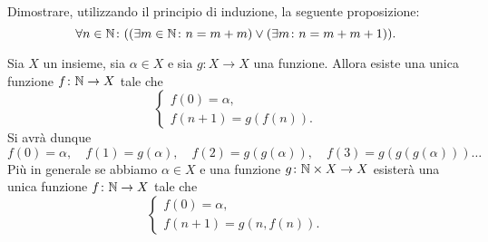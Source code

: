 \begin{exercise}
  Dimostrare, utilizzando il principio di induzione, la seguente 
  proposizione:
  \[
  \forall n\in \mathbb N\colon {\left( {\left( \exists m\in \mathbb N\colon n = m + m \right)} 
  \lor {\left( \exists m\colon n = m + m + 1 \right)} \right)}.  
  \]
\end{exercise}

\begin{theorem}
\label{th:induzione}%
Sia $X$ un insieme, sia $\alpha\in X$ e sia $g\colon X\to X$ una funzione.
Allora esiste una unica funzione $f\colon \mathbb N \to X$ tale che
\begin{equation}\label{eq:4835628}
  \begin{cases}
    f(0) = \alpha, \\
    f(n+1) = g(f(n)).
  \end{cases}
\end{equation}
Si avrà dunque
\[
  f(0) = \alpha,\quad
  f(1) = g(\alpha),\quad
  f(2) = g(g(\alpha)),\quad
  f(3) = g(g(g(\alpha)))\dots
\]
Più in generale se abbiamo $\alpha\in X$ e una funzione $g\colon \mathbb N \times X \to X$
esisterà una unica funzione $f\colon \mathbb N \to X$ tale che
%
\begin{equation}
  \begin{cases}
    f(0) = \alpha, \\
    f(n+1) = g(n, f(n)).
  \end{cases}
\end{equation}
\end{theorem}
%
